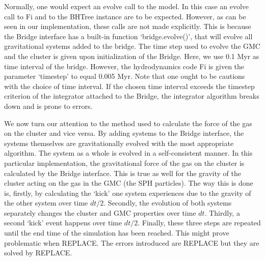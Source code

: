 \documentclass{aa}
\begin{document}
Normally, one would expect an evolve call to the model. In this case an evolve call to Fi and to the BHTree instance are to be expected. However, as can be seen in our implementation, these calls are not made explicitly. This is because the Bridge interface has a built-in function `bridge.evolve()', that will evolve all gravitational systems added to the bridge. The time step used to evolve the GMC and the cluster is given upon initialization of the Bridge. Here, we use 0.1 Myr as time interval of the bridge. However, the hydrodynamics code Fi is given the parameter `timestep' to equal 0.005 Myr. Note that one ought to be cautions with the choice of time interval. If the chosen time interval exceeds the timestep criterion of the integrator attached to the Bridge, the integrator algorithm breaks down and is prone to errors.



We now turn our attention to the method used to calculate the force of the gas on the cluster and vice versa. By adding systems to the Bridge interface, the systems themselves are gravitationally evolved with the most appropriate algorithm. The system as a whole is evolved in a self-consistent manner. In this particular implementation, the gravitational force of the gas on the cluster is calculated by the Bridge interface. This is true as well for the gravity of the cluster acting on the gas in the GMC (the SPH particles). The way this is done is, firstly, by calculating the `kick' one system experiences due to the gravity of the other system over time $dt/2$. Secondly, the evolution of both systems separately changes the cluster and GMC properties over time $dt$. Thirdly, a second `kick' event happens over time $dt/2$. Finally, these three steps are repeated until the end time of the simulation has been reached. This might prove problematic when REPLACE. The errors introduced are REPLACE but they are solved by REPLACE.
\end{document}
